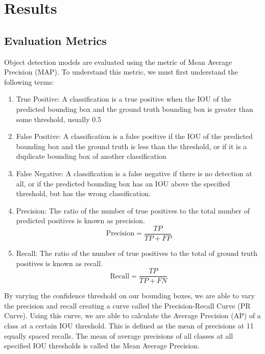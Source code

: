 \documentclass[12pt,letterpaper]{article}
\begin{document}
\section{Results}

\subsection{Evaluation Metrics}

Object detection models are evaluated using the metric of Mean Average Precision (MAP). To understand this metric, we must first understand the following terms:

\begin{enumerate}

    \item True Positive: A classification is a true positive when the IOU of the predicted bounding box and the ground truth bounding box is greater than some threshold, usually 0.5

    \item False Positive: A classification is a false positive if the IOU of the predicted bounding box and the ground truth is less than the threshold, or if it is a duplicate bounding box of another classification

    \item False Negative: A classification is a false negative if there is no detection at all, or if the predicted bounding box has an IOU above the specified threshold, but has the wrong classification.

    \item Precision: The ratio of the number of true positives to the total number of predicted positives is known as precision.
        \[ \text{Precision} = \frac{TP}{TP+FP} \]

    \item Recall: The ratio of the number of true positives to the total of ground truth positives is known as recall.
        \[ \text{Recall} = \frac{TP}{TP+FN}  \]

\end{enumerate}

By varying the confidence threshold on our bounding boxes, we are able to vary the precision and recall creating a curve called the Precision-Recall Curve (PR Curve). Using this curve, we are able to calculate the Average Precision (AP) of a class at a certain IOU threshold. This is defined as the mean of precisions at 11 equally spaced recalls. The mean of average precisions of all classes at all specified IOU thresholds is called the Mean Average Precision.
\end{document}

